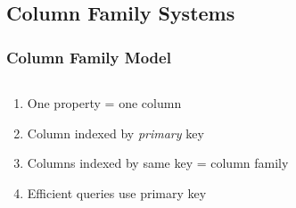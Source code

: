 \documentclass[11pt]{beamer}
\begin{document}
    \subsection{Column Family Systems}\label{subsec:columnFamilyModel}
    \begin{frame}
        \frametitle{Column Family Model}
        \begin{columns}
            \begin{column}{0.5\textwidth}
                \begin{enumerate}
                    \item One property = one column \bigskip
                    \item Column indexed by \textit{primary} key \bigskip
                    \item Columns indexed by same key = column family \bigskip
                    \item Efficient queries use primary key
                \end{enumerate}
            \end{column}
            \begin{column}{0.5\textwidth}
            \end{column}
        \end{columns}
    \end{frame}
\end{document}
